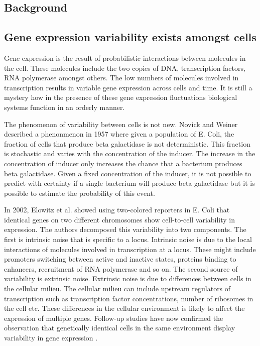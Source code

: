 \subsection{Background}

\subsection{Gene expression variability exists amongst cells}

Gene expression is the result of probabilistic interactions between molecules in the cell. These molecules include the two copies of DNA, transcription factors, RNA polymerase amongst others. The low numbers of molecules involved in transcription results in  variable gene expression across cells and time. It is still a mystery how in the presence of these gene expression fluctuations biological systems function in an orderly manner.

The phenomenon of variability between cells is not new. Novick and Weiner \cite{novick_enzyme_1957} \cite{raj_nature_2008} described a phenonmenon in 1957 where given a population of E. Coli, the fraction of cells that produce beta galactidase is not deterministic. This fraction is stochastic and varies with the concentration of the inducer. The increase in the concentration of inducer only increases the chance that a bacterium produces beta galactidase. Given a fixed concentration of the inducer, it is not possible to predict with certainty if a single bacterium will produce beta galactidase but it is possible to estimate the probability of this event.

In 2002, Elowitz et al.  \cite{elowitz_stochastic_2002} showed using two-colored reporters in E. Coli that identical genes on two different chromosomes show cell-to-cell variability in expression. The authors decomposed this variability into two components. The first is intrinsic noise that is specific to a locus. Intrinsic noise is due to the local interactions of molecules involved in transcription at a locus. These might include promoters switching between active and inactive states, proteins binding to enhancers, recruitment of RNA polymerase and so on. The second source of variability is extrinsic noise. Extrinsic noise is due to differences between cells in the cellular milieu. The cellular milieu can include upstream regulators of transcription such as transcription factor concentrations, number of ribosomes in the cell etc. These differences in the cellular environment is likely to affect the expression of multiple genes. Follow-up studies have now confirmed the observation that genetically identical cells in the same environment display variability in gene expression \cite{raser_control_2004,blake_phenotypic_2006,blake_noise_2003,raser_noise_2005,volfson_origins_2006}.

